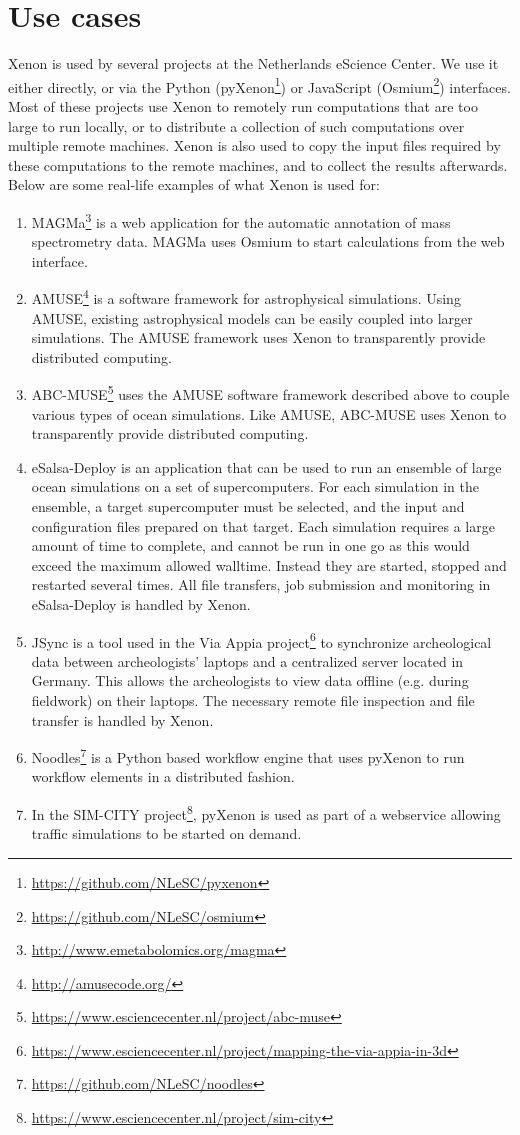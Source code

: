 \documentclass[12pt, a4paper, twoside, openany, titlepage]{book}
\begin{document}
\section{Use cases}

Xenon is used by several projects at the Netherlands eScience Center. We use it either directly, or via the Python (pyXenon\footnote{\url{https://github.com/NLeSC/pyxenon}}) or JavaScript (Osmium\footnote{\url{https://github.com/NLeSC/osmium}}) interfaces. Most of these projects use Xenon to remotely run computations that are too large to run locally, or to distribute a collection of such computations over multiple remote machines. Xenon is also used to copy the input files required by these computations to the remote machines, and to collect the results afterwards. Below are some real-life examples of what Xenon is used for:
\begin{enumerate}
\item{MAGMa\footnote{\url{http://www.emetabolomics.org/magma}} is a web application for the automatic annotation of mass spectrometry data. MAGMa uses Osmium to start calculations from the web interface.}
\item{AMUSE\footnote{\url{http://amusecode.org/}} is a software framework for astrophysical simulations. Using AMUSE, existing astrophysical models can be easily coupled into larger simulations. The AMUSE framework uses Xenon to transparently provide distributed computing.}
\item{ABC-MUSE\footnote{\url{https://www.esciencecenter.nl/project/abc-muse}} uses the AMUSE software framework described above to couple various types of ocean simulations. Like AMUSE, ABC-MUSE uses Xenon to transparently provide distributed computing.}
\item{eSalsa-Deploy is an application that can be used to run an ensemble of large ocean simulations on a set of supercomputers. For each simulation in the ensemble, a target supercomputer must be selected, and the input and configuration files prepared on that target. Each simulation requires a large amount of time to complete, and cannot be run in one go as this would exceed the maximum allowed walltime. Instead they are started, stopped and restarted several times. All file transfers, job submission and monitoring in eSalsa-Deploy is handled by Xenon.}
\item{JSync is a tool used in the Via Appia project\footnote{\url{https://www.esciencecenter.nl/project/mapping-the-via-appia-in-3d}} to synchronize archeological data between archeologists' laptops and a centralized server located in Germany. This allows the archeologists to view data offline (e.g. during fieldwork) on their laptops. The necessary remote file inspection and file transfer is handled by Xenon.}
\item{Noodles\footnote{\url{https://github.com/NLeSC/noodles}} is a Python based workflow engine that uses pyXenon to run workflow elements in a distributed fashion.}
\item{In the SIM-CITY project\footnote{\url{https://www.esciencecenter.nl/project/sim-city}}, pyXenon is used as part of a webservice allowing traffic simulations to be started on demand.}
\end{enumerate}
\end{document}
